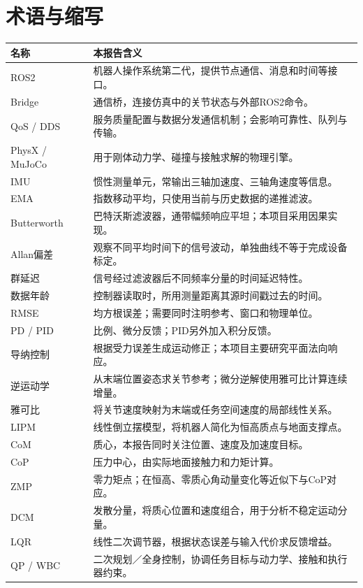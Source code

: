 \chapter{术语与缩写}
\begin{longtable}{p{.20\linewidth}p{.70\linewidth}}
\toprule 名称 & 本报告含义\\\midrule\endhead
ROS2 & 机器人操作系统第二代，提供节点通信、消息和时间等接口。\\
Bridge & 通信桥，连接仿真中的关节状态与外部ROS2命令。\\
QoS / DDS & 服务质量配置与数据分发通信机制；会影响可靠性、队列与传输。\\
PhysX / MuJoCo & 用于刚体动力学、碰撞与接触求解的物理引擎。\\
IMU & 惯性测量单元，常输出三轴加速度、三轴角速度等信息。\\
EMA & 指数移动平均，只使用当前与历史数据的递推滤波。\\
Butterworth & 巴特沃斯滤波器，通带幅频响应平坦；本项目采用因果实现。\\
Allan偏差 & 观察不同平均时间下的信号波动，单独曲线不等于完成设备标定。\\
群延迟 & 信号经过滤波器后不同频率分量的时间延迟特性。\\
数据年龄 & 控制器读取时，所用测量距离其源时间戳过去的时间。\\
RMSE & 均方根误差；需要同时注明参考、窗口和物理单位。\\
PD / PID & 比例、微分反馈；PID另外加入积分反馈。\\
导纳控制 & 根据受力误差生成运动修正；本项目主要研究平面法向响应。\\
逆运动学 & 从末端位置姿态求关节参考；微分逆解使用雅可比计算连续增量。\\
雅可比 & 将关节速度映射为末端或任务空间速度的局部线性关系。\\
LIPM & 线性倒立摆模型，将机器人简化为恒高质点与地面支撑点。\\
CoM & 质心，本报告同时关注位置、速度及加速度目标。\\
CoP & 压力中心，由实际地面接触力和力矩计算。\\
ZMP & 零力矩点；在恒高、零质心角动量变化等近似下与CoP对应。\\
DCM & 发散分量，将质心位置和速度组合，用于分析不稳定运动分量。\\
LQR & 线性二次调节器，根据状态误差与输入代价求反馈增益。\\
QP / WBC & 二次规划／全身控制，协调任务目标与动力学、接触和执行器约束。\\

\end{longtable}
